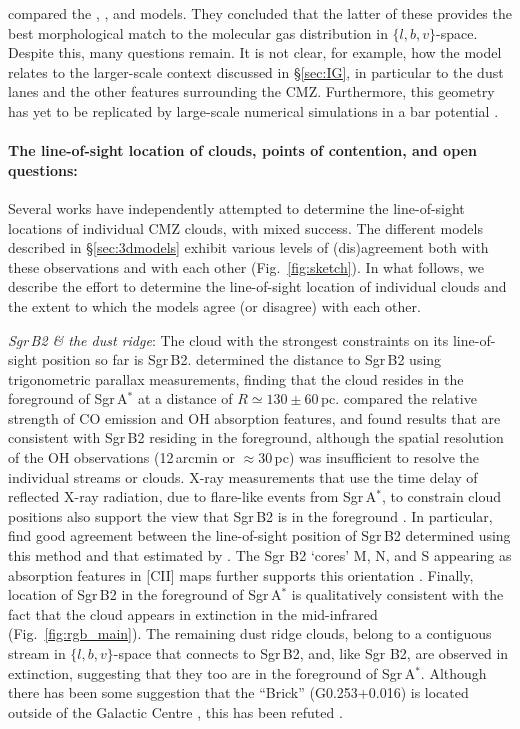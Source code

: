 \citet{Henshaw2016b} compared the \citet{Sofue1995a}, \citet{Molinari2011}, and \citet{Kruijssen2015} models. 
They concluded that the latter of these provides the best morphological match to the molecular gas distribution in $\{l,b,v\}$-space. 
Despite this, many questions remain. 
It is not clear, for example, how the \citet{Kruijssen2015} model relates to the larger-scale context discussed in \S\ref{sec:IG}, in particular to the dust lanes and the other features surrounding the CMZ. 
Furthermore, this geometry has yet to be replicated by large-scale numerical simulations in a bar potential \citep{Armillotta2020, Tress2020}. 

\paragraph{The line-of-sight location of clouds, points of contention, and open questions:}
\label{sec:3dobs} Several works have independently attempted to determine the line-of-sight locations of individual CMZ clouds, with mixed success. 
The different models described in \S\ref{sec:3dmodels} exhibit various levels of (dis)agreement both with these observations and with each other (Fig.~\ref{fig:sketch}). 
In what follows, we describe the effort to determine the line-of-sight location of individual clouds and the extent to which the models agree (or disagree) with each other. 
\medskip

\noindent\emph{Sgr\,B2 \& the dust ridge}: The cloud with the strongest constraints on its line-of-sight position so far is Sgr\,B2.
\citet{Reid2009} determined the distance to Sgr\,B2 using trigonometric parallax measurements, finding that the cloud resides in the foreground of Sgr\,A$^{*}$ at a distance of $R\simeq130\pm60$\,pc. 
\citet[][see also \citealp{Yan2017}]{Sawada2004} compared the relative strength of CO emission and OH absorption features, and found results that are consistent with Sgr\,B2 residing in the foreground, although the spatial resolution of the OH observations (12\,arcmin or $\approx30$\,pc) was insufficient to resolve the individual streams or clouds.
X-ray measurements that use the time delay of reflected X-ray radiation, due to flare-like events from Sgr\,A$^{*}$, to constrain cloud positions also support the view that Sgr\,B2 is in the foreground \citep{Ponti2010,Clavel2013,Walls2016, Churazov2017a, Churazov2017b, Chuard2018, Terrier2018}.
In particular, \citet{Chuard2018} find good agreement between the line-of-sight position of Sgr\,B2 determined using this method and that estimated by \citet{Reid2009}.
The Sgr B2 `cores' M, N, and S appearing as absorption features in [CII] maps further supports this orientation \citep{Harris2021}.
Finally, location of Sgr\,B2 in the foreground of Sgr\,A$^{*}$ is qualitatively consistent with the fact that the cloud appears in extinction in the mid-infrared (Fig.~\ref{fig:rgb_main}).
The remaining dust ridge clouds, belong to a contiguous stream in $\{l,b,v\}$-space that connects to Sgr\,B2, and, like Sgr B2, are observed in extinction, suggesting that they too are in the foreground of Sgr\,A$^{*}$. Although there has been some suggestion that the ``Brick'' (G0.253+0.016) is located outside of the Galactic Centre \citep{Zoccali2021}, this has been refuted \citep{Nogueras-Lara2021}.

